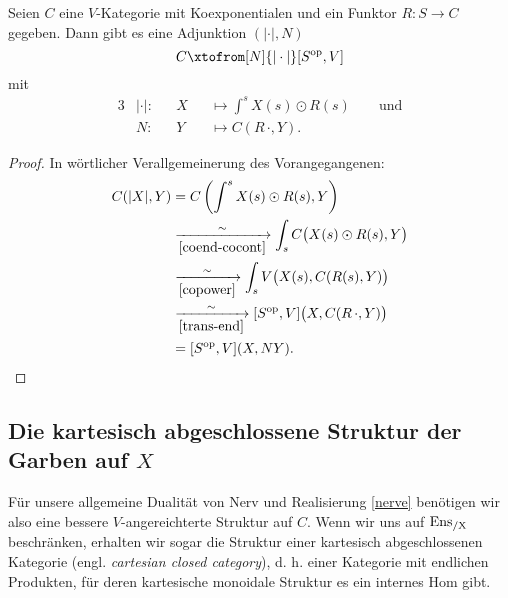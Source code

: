 \begin{theorem} 
  \label{nerve}
  Seien $C$ eine $V$-Kategorie mit Koexponentialen und ein Funktor $R:
  S \to C$ gegeben. Dann gibt es eine Adjunktion $(|\cdot|, N)$  
  \[ C \xtofrom[N]{|\cdot|} [S\op, V] \]
  mit
  \begin{alignat*}{3}
    &|\cdot|: && X &&\mapsto \int^s X(s) \odot R(s) \qquad \text{und} \\
    &N: && Y &&\mapsto C(R \, \cdot, Y).
  \end{alignat*}
\end{theorem}
\begin{proof}
  In wörtlicher Verallgemeinerung des Vorangegangenen:
  \begin{align*}
     C(|X|, Y)
     &= C \left( \int^s X(s) \odot R(s), Y \right) \\
     & \xrightarrow[\ref{coend-cocont}]{\sim}
       \int_s C \big( X(s) \odot R(s), Y \big) \\
     & \xrightarrow[\ref{copower}]{\sim}
       \int_s V \big( X(s), C(R(s), Y) \big) \\
     & \xrightarrow[\ref{trans-end}]{\sim}
       [S^\mathrm{op}, V] \big( X, C(R \, \cdot, Y) \big) \\
     &= [S^\mathrm{op}, V] (X, NY).
  \end{align*}
\end{proof}


\subsection{Die kartesisch abgeschlossene Struktur der Garben auf $X$}

Für unsere allgemeine Dualität von Nerv und Realisierung \ref{nerve}
benötigen wir also eine bessere $V$-angereichterte Struktur auf
$C$. Wenn wir uns auf $\operatorname{Ens_{/X}}$ beschränken, erhalten wir sogar die
Struktur einer kartesisch abgeschlossenen Kategorie
(engl. \emph{cartesian closed category}), d. h. einer Kategorie mit
endlichen Produkten, für deren kartesische monoidale Struktur es ein
internes Hom gibt.

